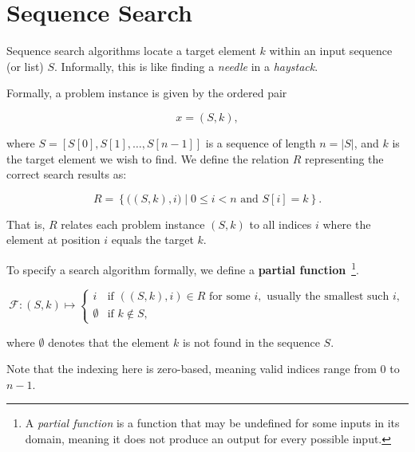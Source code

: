 \section{Sequence Search}

Sequence search algorithms locate a target element \( k \) within an input sequence (or list) \( S \). Informally, this is like finding a \emph{needle} in a \emph{haystack}.

Formally, a problem instance is given by the ordered pair

\[
    x = (S, k),
\]

where \( S = [S[0], S[1], \ldots, S[n-1]] \) is a sequence of length \( n = |S| \), and \( k \) is the target element we wish to find. We define the relation \( R \) representing the correct search results as:

\[
    R = \left\{ \big((S, k), i\big) \mid 0 \leq i < n \text{ and } S[i] = k \right\}.
\]

That is, \( R \) relates each problem instance \((S, k)\) to all indices \( i \) where the element at position \( i \) equals the target \( k \).

To specify a search algorithm formally, we define a \textbf{partial function}~\footnote{A \emph{partial function} is a function that may be undefined for some inputs in its domain, meaning it does not produce an output for every possible input.}.

\[
    \mathcal{F}: (S, k) \mapsto 
    \begin{cases}
        i & \text{if } ( (S, k), i ) \in R \text{ for some } i, \text{ usually the smallest such } i, \\
        \emptyset & \text{if } k \notin S,
    \end{cases}
\]

where \(\emptyset\) denotes that the element \( k \) is not found in the sequence \( S \).

Note that the indexing here is zero-based, meaning valid indices range from \(0\) to \(n-1\).
